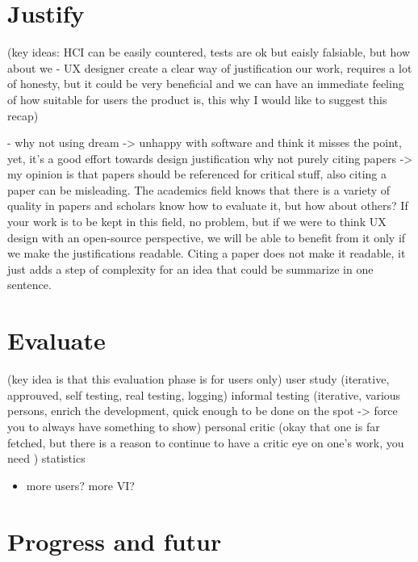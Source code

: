 \documentclass[]{article}
\providecommand{\tightlist}{%
  \setlength{\itemsep}{0pt}\setlength{\parskip}{0pt}}
\begin{document}
\section{Justify}\label{justify}

(key ideas: HCI can be easily countered, tests are ok but eaisly
falsiable, but how about we - UX designer create a clear way of
justification our work, requires a lot of honesty, but it could be very
beneficial and we can have an immediate feeling of how suitable for
users the product is, this why I would like to suggest this recap)

- why not using dream -\textgreater{} unhappy with software and think it
misses the point, yet, it's a good effort towards design justification
why not purely citing papers -\textgreater{} my opinion is that papers
should be referenced for critical stuff, also citing a paper can be
misleading. The academics field knows that there is a variety of quality
in papers and scholars know how to evaluate it, but how about others? If
your work is to be kept in this field, no problem, but if we were to
think UX design with an open-source perspective, we will be able to
benefit from it only if we make the justifications readable. Citing a
paper does not make it readable, it just adds a step of complexity for
an idea that could be summarize in one sentence.

\section{Evaluate}\label{evaluate}

(key idea is that this evaluation phase is for users only) user study
(iterative, approuved, self testing, real testing, logging) informal
testing (iterative, various persons, enrich the development, quick
enough to be done on the spot -\textgreater{} force you to always have
something to show) personal critic (okay that one is far fetched, but
there is a reason to continue to have a critic eye on one's work, you
need ) statistics

\begin{itemize}
\tightlist
\item
  more users? more VI?
\end{itemize}

\section{Progress and futur}\label{progress-and-futur}
\end{document}

